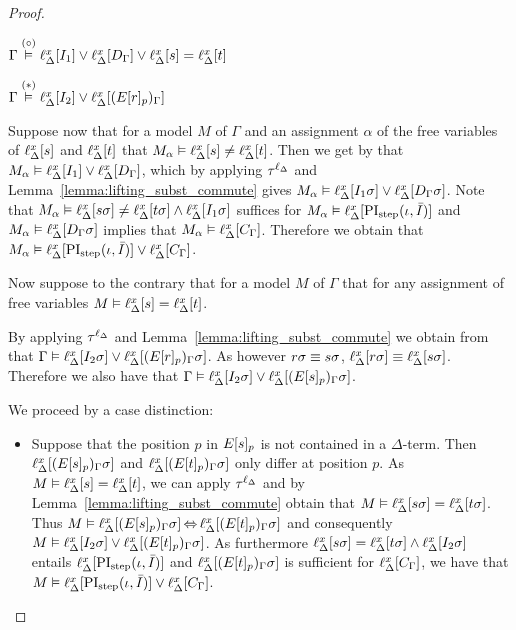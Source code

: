 \begin{proof}
\begin{indproof}
			$\Gamma \stackrel{(\circ)}{\vDash} \ell_{\Delta}^{x}[I_1] \lor \ell_{\Delta}^{x}[D_\Gamma] \lor \ell_{\Delta}^{x}[s]=\ell_{\Delta}^{x}[t]$

			$\Gamma \stackrel{(*)}{\vDash} \ell_{\Delta}^{x}[I_2] \lor \ell_{\Delta}^{x}[(E{[r]_{p}})_\Gamma]$

			Suppose now that for a model $M$ of $\Gamma$ and an assignment $\alpha$ of the free variables of $\ell_{\Delta}^{x}[s]$ and $\ell_{\Delta}^{x}[t]$ that $M_\alpha \vDash \ell_{\Delta}^{x}[s]\neq \ell_{\Delta}^{x}[t]$.
			Then we get by \markA{} that $M_\alpha \vDash \ell_{\Delta}^{x}[I_1] \lor \ell_{\Delta}^{x}[D_\Gamma]$, which by applying $\tau^{\ell_\Delta}$ and Lemma~\ref{lemma:lifting_subst_commute} gives $M_\alpha \vDash \ell_{\Delta}^{x}[I_1\sigma] \lor \ell_{\Delta}^{x}[D_\Gamma\sigma]$.
			Note that $M_\alpha \vDash \ell_{\Delta}^{x}[s\sigma]\neq \ell_{\Delta}^{x}[t\sigma] \land \ell_{\Delta}^{x}[I_1\sigma]$ suffices for $M_\alpha \vDash \ell_{\Delta}^{x}[\operatorname{PI}_{\mathrm{step}}(\iota, \bar I)]$ and $M_\alpha \vDash \ell_{\Delta}^{x}[D_\Gamma\sigma]$ implies that $M_\alpha \vDash \ell_{\Delta}^{x}[C_\Gamma]$.
			Therefore we obtain that 
			$M_\alpha \vDash \ell_{\Delta}^{x}[\operatorname{PI}_{\mathrm{step}}(\iota, \bar I)] \lor \ell_{\Delta}^{x}[C_\Gamma]$.

			Now suppose to the contrary that for a model $M$ of $\Gamma$ that for any assignment of free variables $M \entails \lifdelta{s}\nolinebreak=\lifdelta{t}$.

			By applying $\tau^{\ell_\Delta}$ and  Lemma~\ref{lemma:lifting_subst_commute} we obtain from \markB{} that
			$\Gamma \vDash \ell_{\Delta}^{x}[I_2\sigma] \lor \ell_{\Delta}^{x}[(E{[r]_{p}})_\Gamma\sigma]$.
			As however $r\sigma \equiv s\sigma$,
			$\ell_{\Delta}^{x}[r\sigma] \equiv \ell_{\Delta}^{x}[s\sigma]$.
			Therefore we also have that 
			$\Gamma \vDash \ell_{\Delta}^{x}[I_2\sigma] \lor \ell_{\Delta}^{x}[(E{[s]_{p}})_\Gamma\sigma]$.

			We proceed by a case distinction:
			\begin{itemize}
				\item Suppose that the position $p$ in $E{[s]_{p}}$ is not contained in a $\Delta$-term.
					Then
					$\ell_{\Delta}^{x}[(E{[s]_{p}})_\Gamma\sigma]$
					and
					$\ell_{\Delta}^{x}[(E{[t]_{p}})_\Gamma\sigma]$
					only differ at position $p$.
					As $M \vDash \ell_{\Delta}^{x}[s] = \ell_{\Delta}^{x}[t]$, we can apply $\tau^{\ell_\Delta}$ and by Lemma~\ref{lemma:lifting_subst_commute} obtain that 
					$M \vDash \ell_{\Delta}^{x}[s\sigma] = \ell_{\Delta}^{x}[t\sigma]$.
					Thus
					$M\vDash \ell_{\Delta}^{x}[(E{[s]_{p}})_\Gamma\sigma] \operatorname{\Leftrightarrow} 
					\ell_{\Delta}^{x}[(E{[t]_{p}})_\Gamma\sigma]$
					and consequently
					$M \vDash \ell_{\Delta}^{x}[I_2\sigma] \lor \ell_{\Delta}^{x}[(E{[t]_{p}})_\Gamma\sigma]$.
					As furthermore $\ell_{\Delta}^{x}[s\sigma] =\ell_{\Delta}^{x}[t\sigma] \land \ell_{\Delta}^{x}[I_2\sigma]$ entails $\ell_{\Delta}^{x}[\operatorname{PI}_{\mathrm{step}}(\iota, \bar I)]$
					and $\ell_{\Delta}^{x}[(E{[t]_{p}})_\Gamma\sigma]$ is sufficient for $\ell_{\Delta}^{x}[C_\Gamma]$,
					we have that 
					$M\vDash \ell_{\Delta}^{x}[\operatorname{PI}_{\mathrm{step}}(\iota, \bar I)] \lor \ell_{\Delta}^{x}[C_\Gamma]$.


\end{itemize}
\end{indproof}
\end{proof}
